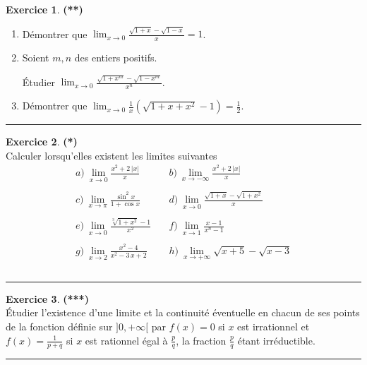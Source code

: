 \documentclass[a4paper,11pt]{article}
\theoremstyle{definition}
\newtheorem{exo}{Exercice} %
\begin{document}
\begin{minipage}[t]{1\linewidth}
\begin{minipage}[t]{0.48\linewidth}
	
	
	\begin{exo}\textbf{(**)}\quad\\[0.2cm]
		\begin{enumerate}
			\item  D\'emontrer que $\displaystyle{ \lim_{x\rightarrow 0}\frac{\sqrt{1+x}-\sqrt{1-x}}{ x}=1}$.
			\item  Soient $m,n$ des entiers positifs.
			
			 \'Etudier $\displaystyle{\lim_{x\rightarrow 0}\frac{\sqrt{1+x^m}-
					\sqrt{1-x^m}}{ x^n}}$.
			\item D\'emontrer que $\displaystyle{ \lim_{x\rightarrow 0}\frac{1}{ x}(\sqrt{1+x+x^2}-1)=
				\frac{1}{ 2}}$.
		\end{enumerate}
	
		\centering
		\rule{1\linewidth}{0.6pt}
	\end{exo}

	\begin{exo}\textbf{(*)}\quad\\[0.2cm]
 Calculer lorsqu'elles existent les limites suivantes
$$\begin{array}{lll}
a)\ \lim\limits_{x\rightarrow 0}\frac{x^2+2\,|x|}{x} &\quad  b)\
\lim\limits_{x\rightarrow -\infty}\frac{x^2+2\,|x|}{x}\\
\\
c) \ \lim\limits_{x\rightarrow\pi}\frac{\sin^2x}{1+\cos x}&
\quad  d)\ \lim\limits_{x\rightarrow 0}\frac{\sqrt{1+x}-\sqrt{1+x^2}}{x}\\
\\
e)\ \lim\limits_{x\rightarrow 0}\frac{\sqrt[3]{1+x^2}-1}{x^2}&
\quad  f)\ \lim\limits_{x\rightarrow 1}\frac{x-1}{x^n-1}\\
\\
g)\ \lim\limits_{x\rightarrow 2}\frac{x^2-4}{x^2-3\,x+2}&
\quad  h)\ \lim\limits_{x\rightarrow +\infty}\sqrt{x+5}-\sqrt{x-3}\\
\\
\end{array}$$


		\centering
\rule{1\linewidth}{0.6pt}
\end{exo}

	\begin{exo}\textbf{(***)}\quad\\[0.2cm]
	Étudier l'existence d'une limite et la continuité éventuelle en chacun de ses points de la fonction définie sur $]0,+\infty[$ par $f(x)=0$ si $x$ est irrationnel et $f(x)=\frac{1}{p+q}$ si $x$ est rationnel égal à $\frac{p}{q}$, la fraction $\frac{p}{q}$ étant irréductible.
	
	\centering
	\rule{1\linewidth}{0.6pt}
\end{exo}


\end{minipage}
\end{minipage}
\end{document}
